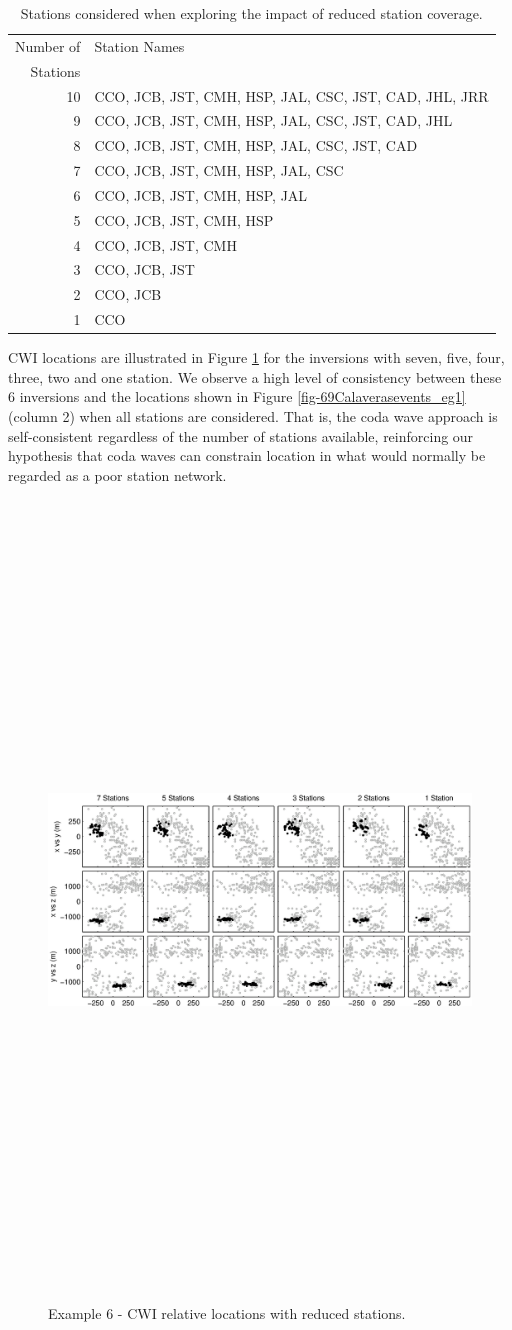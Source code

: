 \documentclass[extra, onecolumn, doublespacing]{gji}
\begin{document}
\begin{table}
\caption{Stations considered when exploring the impact of reduced
station coverage.} \label{tab:Calaveras-stationremoval}
\begin{tabular}{|r|l|}
\hline
Number of & Station Names\\
Stations  & \\
\hline
10 & CCO, JCB, JST, CMH, HSP, JAL, CSC, JST, CAD, JHL, JRR\\
9  & CCO, JCB, JST, CMH, HSP, JAL, CSC, JST, CAD, JHL\\
8  & CCO, JCB, JST, CMH, HSP, JAL, CSC, JST, CAD\\
7  & CCO, JCB, JST, CMH, HSP, JAL, CSC \\
6  & CCO, JCB, JST, CMH, HSP, JAL \\
5  & CCO, JCB, JST, CMH, HSP \\
4  & CCO, JCB, JST, CMH \\
3  & CCO, JCB, JST \\
2  & CCO, JCB \\
1  & CCO \\
\hline
\end{tabular}
\end{table}


CWI locations are illustrated in Figure \ref{fig-CWIreducesstats}
for the inversions with seven, five, four, three, two and one
station. We observe a high level of consistency between these 6
inversions and the locations shown in Figure
\ref{fig-69Calaverasevents_eg1} (column 2) when all stations are
considered. That is, the coda wave approach is self-consistent
regardless of the number of stations available, reinforcing our
hypothesis that coda waves can constrain location in what would
normally be regarded as a poor station network.

\begin{figure}
\includegraphics[angle=90,height = 50pc]{diags/CalaverasLoc2.eps}
\caption{Example 6 - CWI relative locations with reduced stations.}
\label{fig-CWIreducesstats}
\end{figure}
\end{document}
